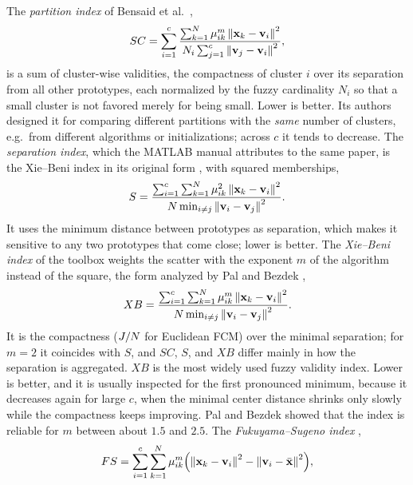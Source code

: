 The \emph{partition index} of Bensaid et al.\ \cite{bensaid:1996:validity},
\begin{equation}
  SC=\sum_{i=1}^{c}\frac{\sum_{k=1}^{N}\mu_{ik}^m\left\lVert \mathbf{x}_k-\mathbf{v}_i \right\rVert^2}{N_i\sum_{j=1}^{c}\left\lVert \mathbf{v}_j-\mathbf{v}_i \right\rVert^2},
  \label{eq:val:sc}
\end{equation}
is a sum of cluster-wise validities, the compactness of cluster $i$ over its separation from all other prototypes, each normalized by the fuzzy cardinality $N_i$ so that a small cluster is not favored merely for being small. Lower is better. Its authors designed it for comparing different partitions with the \emph{same} number of clusters, e.g.\ from different algorithms or initializations; across $c$ it tends to decrease. The \emph{separation index}, which the MATLAB manual attributes to the same paper, is the Xie--Beni index in its original form \cite{xie:1991:validity}, with squared memberships,
\begin{equation}
  S=\frac{\sum_{i=1}^{c}\sum_{k=1}^{N}\mu_{ik}^2\left\lVert \mathbf{x}_k-\mathbf{v}_i \right\rVert^2}{N\min_{i\ne j}\left\lVert \mathbf{v}_i-\mathbf{v}_j \right\rVert^2}.
  \label{eq:val:s}
\end{equation}
It uses the minimum distance between prototypes as separation, which makes it sensitive to any two prototypes that come close; lower is better. The \emph{Xie--Beni index} of the toolbox weights the scatter with the exponent $m$ of the algorithm instead of the square, the form analyzed by Pal and Bezdek \cite{pal:1995:validity},
\begin{equation}
  XB=\frac{\sum_{i=1}^{c}\sum_{k=1}^{N}\mu_{ik}^m\left\lVert \mathbf{x}_k-\mathbf{v}_i \right\rVert^2}{N\min_{i\ne j}\left\lVert \mathbf{v}_i-\mathbf{v}_j \right\rVert^2}.
  \label{eq:val:xb}
\end{equation}
It is the compactness ($J/N$ for Euclidean FCM) over the minimal separation; for $m=2$ it coincides with $S$, and $SC$, $S$, and $XB$ differ mainly in how the separation is aggregated. $XB$ is the most widely used fuzzy validity index. Lower is better, and it is usually inspected for the first pronounced minimum, because it decreases again for large $c$, when the minimal center distance shrinks only slowly while the compactness keeps improving. Pal and Bezdek showed that the index is reliable for $m$ between about $1.5$ and $2.5$. The \emph{Fukuyama--Sugeno index} \cite{fukuyama:1989:validity},
\begin{equation}
  FS=\sum_{i=1}^{c}\sum_{k=1}^{N}\mu_{ik}^m\Bigl(\left\lVert \mathbf{x}_k-\mathbf{v}_i \right\rVert^2-\left\lVert \mathbf{v}_i-\bar{\mathbf{x}} \right\rVert^2\Bigr),
  \label{eq:val:fs}
\end{equation}
